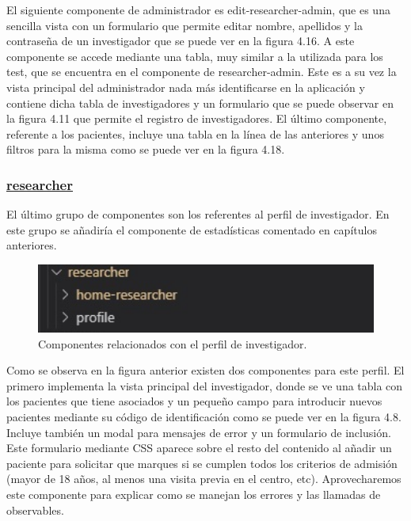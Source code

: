     El siguiente componente de administrador es edit-researcher-admin, que es una sencilla vista con un formulario que permite editar nombre, apellidos y la contraseña de un investigador que se puede ver en la figura 4.16. A este componente se accede mediante una tabla, muy similar a la utilizada para los test, que se encuentra en el componente de researcher-admin. Este es a su vez la vista principal del administrador nada más identificarse en la aplicación y contiene dicha tabla de investigadores y un formulario que se puede observar en la figura 4.11 que permite el registro de investigadores. El último componente, referente a los pacientes, incluye una tabla en la  línea de las anteriores y unos filtros para la misma como se puede ver en la figura 4.18.\newpage
    
    \subsubsection{\underline{researcher}}
    
    El último grupo de componentes son los referentes al perfil de investigador. En este grupo se añadiría el componente de estadísticas comentado en capítulos anteriores.
    
    \begin{figure}[h]
    \centering
    \includegraphics[width=1\textwidth]{images/researcherComponent.jpg}
    \caption{Componentes relacionados con el perfil de investigador.}
    \end{figure}
    \FloatBarrier
    
    Como se observa en la figura anterior existen dos componentes para este perfil. El primero implementa la vista principal del investigador, donde se ve una tabla con los pacientes que tiene asociados y un pequeño campo para introducir nuevos pacientes mediante su código de identificación como se puede ver en la figura 4.8. Incluye también un modal para mensajes de error y un formulario de inclusión. Este formulario mediante CSS aparece sobre el resto del contenido al añadir un paciente para solicitar que marques si se cumplen todos los criterios de admisión (mayor de 18 años, al menos una visita previa en el centro, etc). Aprovecharemos este componente para explicar como se manejan los errores y las llamadas de observables.
    
